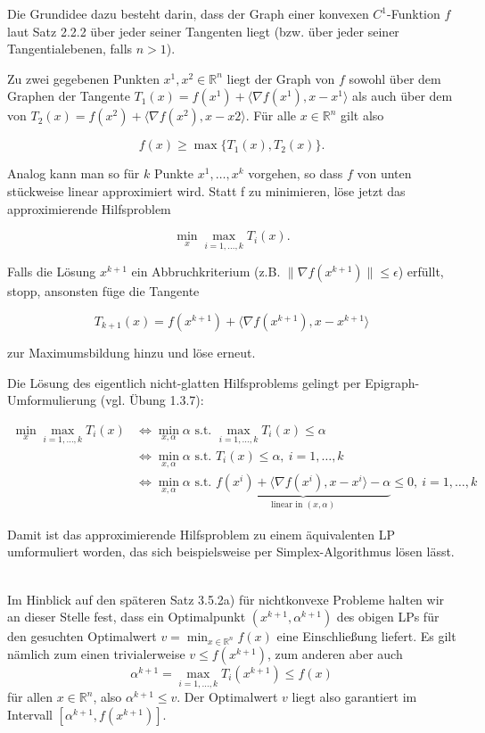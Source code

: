 \documentclass[12pt]{extreport} %
\newcommand{\R}{\mathbb{R}}
\theoremstyle{named}
\theoremstyle{nnamed}
\theoremstyle{itshape}
\theoremstyle{normal}
\begin{document}
Die Grundidee dazu besteht darin, dass der Graph einer konvexen $C^1$-Funktion $f$ laut Satz 2.2.2 über jeder seiner Tangenten liegt (bzw. über jeder seiner Tangentialebenen, falls $n > 1$). ~\bigskip

Zu zwei gegebenen Punkten $x^1, x^2 \in \R^n$ liegt der Graph von $f$ sowohl über dem Graphen der Tangente $T_1 (x) = f(x^1) + \langle \nabla f(x^1), x - x^1 \rangle$ als auch über dem von $T_2 (x) = f(x^2) + \langle \nabla f(x^2), x - x2 \rangle$. Für alle $x \in \R^n$ gilt also

		$$ f(x) \geq \max \big\{ T_1(x), T_2(x) \big\} . $$

Analog kann man so für $k$ Punkte $x^1, \dotsc, x^k$ vorgehen, so dass $f$ von unten stückweise linear approximiert wird. Statt f zu minimieren, löse jetzt das approximierende Hilfsproblem

		$$ \min_x \max_{i = 1, \dotsc, k} T_i(x). $$
		
Falls die Lösung $x^{k+1}$ ein Abbruchkriterium (z.B. $\| \nabla f(x^{k+1})\| \leq \epsilon$) erfüllt, stopp, ansonsten füge die Tangente

	$$ T_{k+1}(x) = f(x^{k+1}) + \langle \nabla f(x^{k+1}), x -x^{k+1} \rangle $$

zur Maximumsbildung hinzu und löse erneut. ~\bigskip

Die Lösung des eigentlich nicht-glatten Hilfsproblems gelingt per Epigraph-Umformulierung (vgl. Übung 1.3.7):

	\begin{align*}
		\min_x \max_{i=1, \dotsc, k} T_i(x) & \iff \min_{x, \alpha} \alpha \text{ s.t. } \max_{i=1, \dotsc, k} T_i(x) \leq \alpha \\
		& \iff \min_{x, \alpha} \alpha \text{ s.t. } T_i(x) \leq \alpha, ~i=1, \dotsc, k \\
		& \iff \min_{x, \alpha} \alpha \text{ s.t. } \underbrace{f(x^i) + \langle \nabla f(x^i), x - x^i \rangle - \alpha}_{\text{linear in } (x, \alpha)} \leq 0, ~i = 1, \dotsc, k
	\end{align*}

Damit ist das approximierende Hilfsproblem zu einem äquivalenten LP umformuliert worden, das sich beispielsweise per Simplex-Algorithmus lösen lässt. ~\bigskip

Im Hinblick auf den späteren Satz 3.5.2a) für nichtkonvexe Probleme halten wir an dieser Stelle fest, dass ein Optimalpunkt $(x^{k+1}, \alpha^{k+1})$ des obigen LPs für den gesuchten Optimalwert $v = \min_{x \in \R^n} f(x)$ eine Einschließung liefert. Es gilt nämlich zum einen trivialerweise $v \leq f(x^{k+1})$, zum anderen aber auch
	$$ \alpha^{k+1} = \max_{i=1, \dotsc, k} T_i(x^{k+1}) \leq f(x) $$
für allen $x \in \R^n$, also $\alpha^{k+1} \leq v$. Der Optimalwert $v$ liegt also garantiert im Intervall $[\alpha^{k+1}, f(x^{k+1})]$.
\end{document}
